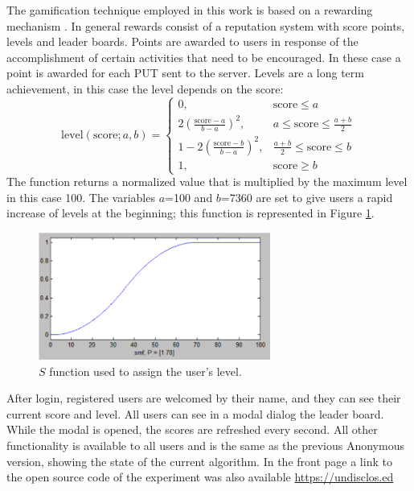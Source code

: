 \documentclass{llncs}
\begin{document}
The gamification technique employed in this work is based on a rewarding mechanism
\cite{dubois2013understanding}. In general rewards  consist of a reputation system
with score points, levels and leader boards. Points are awarded to users in response of
the accomplishment of certain activities that need to be encouraged. In these case
a point is awarded for each PUT sent to the server. Levels are a long
term achievement, in this case the level depends on the score:
\[ \text{level}(\text{score};a,b)=
    \begin{cases}
      0,                                    &  \text{score}\leq a\\
      2(\frac{\text{score}-a}{b-a})^{2},    &  a\leq \text{score}\leq \frac{a+b}{2}\\
      1-2(\frac{\text{score}-b}{b-a})^{2},  & \frac{a+b}{2} \leq \text{score}\leq b\\
      1,                                    & \text{score}\geq b
   \end{cases}
\]
The function returns a normalized value that is multiplied by the maximum level
in this case 100. The variables $a$=100 and $b$=7360 are set to give users a rapid increase of
levels at the beginning; this function is represented in Figure \ref{fig:s}.
%
\begin{figure}[htb]
    \centering
        \includegraphics[width=3in]{img/s.png}
    \caption{$S$ function used to assign the user's level.
    }
    \label{fig:s}
\end{figure}

After login, registered users are welcomed by their name, and they can see
their current score and level. All users can see in a modal dialog the leader board.
While the modal is opened, the scores are refreshed every second. All other
functionality is available to all users and is the same as the previous
Anonymous version, showing the state of the current algorithm.
In the front page a link to the open source code of the experiment was also
available \url{https://undisclos.ed}
\end{document}
